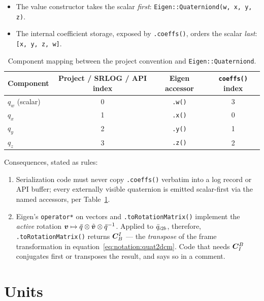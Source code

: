 \begin{itemize}
  \item The value constructor takes the scalar \emph{first}:
    \texttt{Eigen::Quaterniond(w, x, y, z)}.
  \item The internal coefficient storage, exposed by \texttt{.coeffs()},
    orders the scalar \emph{last}: \texttt{[x, y, z, w]}.
\end{itemize}

\begin{table}[htbp]
  \centering
  \caption{Component mapping between the project convention and
    \texttt{Eigen::Quaterniond}.}
  \label{tab:notation:eigenmap}
  \begin{tabular}{lccc}
    \toprule
    Component & Project / SRLOG / API index & Eigen accessor &
      \texttt{coeffs()} index \\
    \midrule
    $q_w$ (scalar) & 0 & \texttt{.w()} & 3 \\
    $q_x$          & 1 & \texttt{.x()} & 0 \\
    $q_y$          & 2 & \texttt{.y()} & 1 \\
    $q_z$          & 3 & \texttt{.z()} & 2 \\
    \bottomrule
  \end{tabular}
\end{table}

Consequences, stated as rules:
\begin{enumerate}
  \item Serialization code must never copy \texttt{.coeffs()} verbatim into a
    log record or API buffer; every externally visible quaternion is emitted
    scalar-first via the named accessors, per
    Table~\ref{tab:notation:eigenmap}.
  \item Eigen's \texttt{operator*} on vectors and
    \texttt{.toRotationMatrix()} implement the \emph{active} rotation
    $\bm{v} \mapsto \bar{q} \otimes \tilde{\bm{v}} \otimes
    \bar{q}^{-1}$. Applied to $\bar{q}_{i2b}$, therefore,
    \texttt{.toRotationMatrix()} returns $\bm{C}_{B}^{I}$ --- the \emph{transpose}
    of the frame transformation in
    equation~\eqref{eq:notation:quat2dcm}. Code that needs $\bm{C}_{I}^{B}$
    conjugates first or transposes the result, and says so in a comment.
\end{enumerate}

\section{Units}
\label{sec:notation:units}


